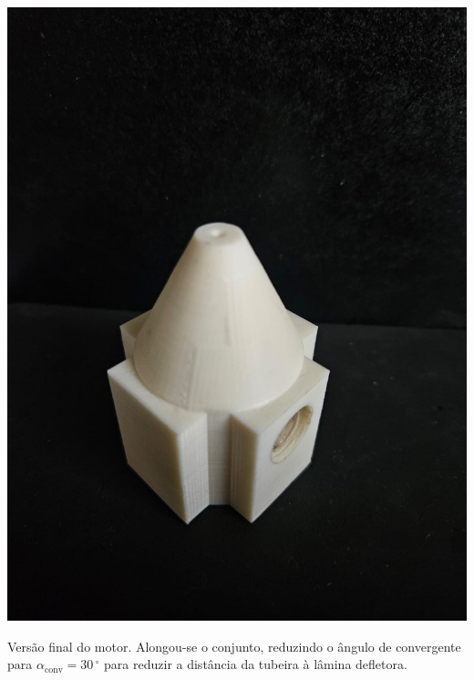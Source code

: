 \begin{minipage}{.49\textwidth}
    \includegraphics[width=\textwidth]{img/app_dev_history/motor6.jpeg}
\end{minipage}
\begin{minipage}{.49\textwidth}
    Versão final do motor. Alongou-se o conjunto, reduzindo o ângulo de convergente para \(\alpha_{\mathrm{conv}} = 30\,\mathrm{^\circ}\) para reduzir a distância da tubeira à lâmina defletora. 
\end{minipage}